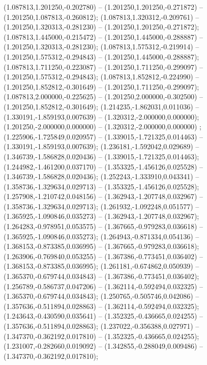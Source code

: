  (1.087813,1.201250,-0.202780) -- (1.201250,1.201250,-0.271872) -- (1.201250,1.087813,-0.260812);
 (1.087813,1.320312,-0.209761) -- (1.201250,1.320313,-0.281230) -- (1.201250,1.201250,-0.271872);
 (1.087813,1.445000,-0.215472) -- (1.201250,1.445000,-0.288887) -- (1.201250,1.320313,-0.281230);
 (1.087813,1.575312,-0.219914) -- (1.201250,1.575312,-0.294843) -- (1.201250,1.445000,-0.288887);
 (1.087813,1.711250,-0.223087) -- (1.201250,1.711250,-0.299097) -- (1.201250,1.575312,-0.294843);
 (1.087813,1.852812,-0.224990) -- (1.201250,1.852812,-0.301649) -- (1.201250,1.711250,-0.299097);
 (1.087813,2.000000,-0.225625) -- (1.201250,2.000000,-0.302500) -- (1.201250,1.852812,-0.301649);
 (1.214235,-1.862031,0.011036) -- (1.330191,-1.859193,0.007639) -- (1.320312,-2.000000,0.000000);
 (1.201250,-2.000000,0.000000) -- (1.320312,-2.000000,0.000000) ;
 (1.225906,-1.725849,0.020957) -- (1.339015,-1.721325,0.014463) -- (1.330191,-1.859193,0.007639);
 (1.236181,-1.592042,0.029689) -- (1.346739,-1.586828,0.020436) -- (1.339015,-1.721325,0.014463);
 (1.244982,-1.461200,0.037170) -- (1.353325,-1.456126,0.025528) -- (1.346739,-1.586828,0.020436);
 (1.252243,-1.333910,0.043341) -- (1.358736,-1.329634,0.029713) -- (1.353325,-1.456126,0.025528);
 (1.257908,-1.210742,0.048156) -- (1.362943,-1.207748,0.032967) -- (1.358736,-1.329634,0.029713);
 (1.261932,-1.092248,0.051577) -- (1.365925,-1.090846,0.035273) -- (1.362943,-1.207748,0.032967);
 (1.264283,-0.978951,0.053575) -- (1.367665,-0.979283,0.036618) -- (1.365925,-1.090846,0.035273);
 (1.264943,-0.871334,0.054136) -- (1.368153,-0.873385,0.036995) -- (1.367665,-0.979283,0.036618);
 (1.263906,-0.769840,0.053255) -- (1.367386,-0.773451,0.036402) -- (1.368153,-0.873385,0.036995);
 (1.261181,-0.674862,0.050939) -- (1.365370,-0.679744,0.034843) -- (1.367386,-0.773451,0.036402);
 (1.256789,-0.586737,0.047206) -- (1.362114,-0.592494,0.032325) -- (1.365370,-0.679744,0.034843);
 (1.250765,-0.505746,0.042086) -- (1.357636,-0.511894,0.028863) -- (1.362114,-0.592494,0.032325);
 (1.243643,-0.430590,0.035641) -- (1.352325,-0.436665,0.024255) -- (1.357636,-0.511894,0.028863);
 (1.237022,-0.356388,0.027971) -- (1.347370,-0.362192,0.017810) -- (1.352325,-0.436665,0.024255);
 (1.231007,-0.282660,0.019092) -- (1.342855,-0.288049,0.009486) -- (1.347370,-0.362192,0.017810);
